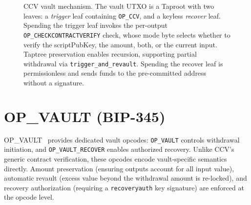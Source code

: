 \begin{figure}[t]
{}
\caption{CCV vault mechanism. The vault UTXO is a Taproot with two leaves:
a \emph{trigger} leaf containing \texttt{OP\_CCV}, and a keyless \emph{recover}
leaf. Spending the trigger leaf invokes the per-output
\texttt{OP\_CHECKCONTRACTVERIFY} check, whose mode byte selects whether to
verify the scriptPubKey, the amount, both, or the current input. Taptree
preservation enables recursion, supporting partial withdrawal via
\texttt{trigger\_and\_revault}. Spending the recover leaf is permissionless
and sends funds to the pre-committed address without a signature.}
\label{fig:ccv_mechanism}
\end{figure}

\section{OP\_VAULT (BIP-345)} \label{se:opvault}

OP\_VAULT~\cite{BIP345} provides dedicated vault opcodes: \texttt{OP\_VAULT} controls
withdrawal initiation, and \texttt{OP\_VAULT\_RECOVER} enables authorized recovery.
Unlike CCV's generic contract verification, these opcodes encode vault-specific semantics
directly. Amount preservation (ensuring outputs account for all input value), automatic
revault (excess value beyond the withdrawal amount is re-locked), and recovery
authorization (requiring a \texttt{recoveryauth} key signature) are enforced at the
opcode level.

